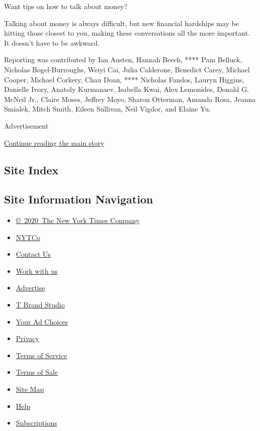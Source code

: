 Want tips on how to talk about money?

Talking about money is always difficult, but new financial hardships may
be hitting those closest to you, making these conversations all the more
important. It doesn't have to be awkward.

Reporting was contributed by Ian Austen, Hannah Beech, **** Pam Belluck,
Nicholas Bogel-Burroughs, Weiyi Cai, Julia Calderone, Benedict Carey,
Michael Cooper, Michael Corkery, Chau Doan, **** Nicholas Fandos, Lauryn
Higgins, Danielle Ivory, Anatoly Kurmanaev, Isabella Kwai, Alex
Lemonides, Donald G. McNeil Jr., Claire Moses, Jeffrey Moyo, Sharon
Otterman, Amanda Rosa, Jeanna Smialek, Mitch Smith, Eileen Sullivan,
Neil Vigdor, and Elaine Yu.

Advertisement

\protect\hyperlink{after-bottom}{Continue reading the main story}

\hypertarget{site-index}{%
\subsection{Site Index}\label{site-index}}

\hypertarget{site-information-navigation}{%
\subsection{Site Information
Navigation}\label{site-information-navigation}}

\begin{itemize}
\tightlist
\item
  \href{https://help.nytimes.com/hc/en-us/articles/115014792127-Copyright-notice}{©~2020~The
  New York Times Company}
\end{itemize}

\begin{itemize}
\tightlist
\item
  \href{https://www.nytco.com/}{NYTCo}
\item
  \href{https://help.nytimes.com/hc/en-us/articles/115015385887-Contact-Us}{Contact
  Us}
\item
  \href{https://www.nytco.com/careers/}{Work with us}
\item
  \href{https://nytmediakit.com/}{Advertise}
\item
  \href{http://www.tbrandstudio.com/}{T Brand Studio}
\item
  \href{https://www.nytimes.com/privacy/cookie-policy\#how-do-i-manage-trackers}{Your
  Ad Choices}
\item
  \href{https://www.nytimes.com/privacy}{Privacy}
\item
  \href{https://help.nytimes.com/hc/en-us/articles/115014893428-Terms-of-service}{Terms
  of Service}
\item
  \href{https://help.nytimes.com/hc/en-us/articles/115014893968-Terms-of-sale}{Terms
  of Sale}
\item
  \href{https://spiderbites.nytimes.com}{Site Map}
\item
  \href{https://help.nytimes.com/hc/en-us}{Help}
\item
  \href{https://www.nytimes.com/subscription?campaignId=37WXW}{Subscriptions}
\end{itemize}
